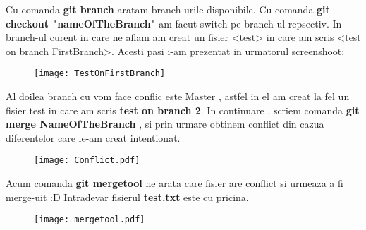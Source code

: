 \tab Cu comanda \textbf{git branch} aratam branch-urile disponibile. Cu comanda \textbf{git checkout "nameOfTheBranch"} am facut switch pe branch-ul repsectiv. In branch-ul curent in care ne aflam am creat un fisier <test> in care am scris <test on branch FirstBranch>. Acesti pasi i-am prezentat in urmatorul screenshoot:
\begin{figure}[h]
\centering
\texttt{[image: TestOnFirstBranch]}
\end{figure}

\tab Al doilea branch cu vom face conflic este Master , astfel in el am creat la fel un fisier test in care am scris \textbf{test on branch 2}.
In continuare , scriem comanda \textbf{git merge NameOfTheBranch} , si prin urmare obtinem conflict din cazua diferentelor care le-am creat intentionat.
\begin{figure}[h]
\centering
\texttt{[image: Conflict.pdf]}
\end{figure}

\tab Acum comanda \textbf{git mergetool} ne arata care fisier are conflict si urmeaza a fi merge-uit :D Intradevar fisierul \textbf{test.txt} este cu pricina.
\begin{figure}[h]
\centering
\texttt{[image: mergetool.pdf]}
\end{figure}
\clearpage